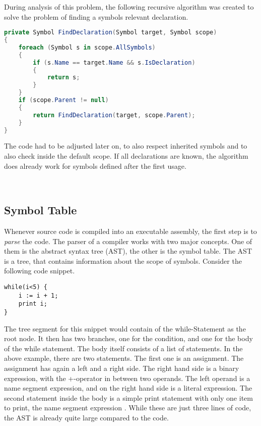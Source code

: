 During analysis of this problem, the following recursive algorithm was created to solve the problem of finding a symbols relevant declaration.

\begin{lstlisting}[language=csharp, caption={Finding Symbol Definition}, captionpos=b, label={lst:findsymbol}]
private Symbol FindDeclaration(Symbol target, Symbol scope)
{
    foreach (Symbol s in scope.AllSymbols)
    {
        if (s.Name == target.Name && s.IsDeclaration)
        {
            return s;
        }
    }
    if (scope.Parent != null)
    {
        return FindDeclaration(target, scope.Parent);
    }
}
\end{lstlisting}
The code had to be adjusted later on, to also respect inherited symbols and to also check inside the default scope.
If all declarations are known, the algorithm does already work for symbols defined after the first usage.


\\


\subsection{Symbol Table}
Whenever source code is compiled into an executable assembly, the first step is to \textit{parse} the code.
The parser of a compiler works with two major concepts.
One of them is the abstract syntax tree (AST), the other is the symbol table.
The AST is a tree, that contains information about the scope of symbols.
Consider the following code snippet.

\begin{lstlisting}[language=dafny, caption={AST Demo Snippet}, captionpos=b, label={lst:astsnipped}]
while(i<5) {
    i := i + 1;
    print i;
}
\end{lstlisting}

The tree segment for this snippet would contain of the while-Statement as the root node.
It then has two branches, one for the condition, and one for the body of the while statement.
The body itself consists of a list of statements.
In the above example, there are two statements.
The first one is an assignment.
The assignment has again a left and a right side.
The right hand side is a binary expression, with the +-operator in between two operands.
The left operand is a name segment expression, and on the right hand side is a literal expression.
The second statement inside the body is a simple print statement with only one item to print, the name segment expression .
While these are just three lines of code, the AST is already quite large compared to the code.\\

